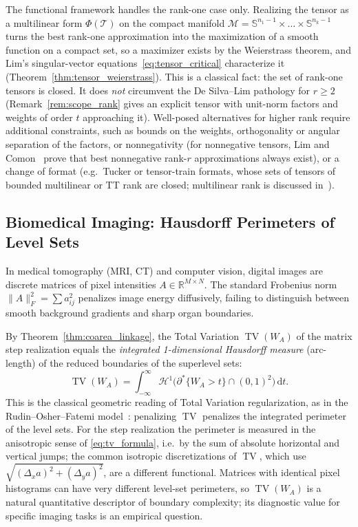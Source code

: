 \documentclass[11pt,a4paper,reqno]{amsart}
\theoremstyle{definition}
\numberwithin{equation}{section}
\newcommand{\R}{\mathbb{R}}
\newcommand{\Sph}{\mathbb{S}}
\newcommand{\TV}{\operatorname{TV}}
\newcommand{\dif}{\,\mathrm{d}}
\begin{document}
The functional framework handles the rank-one case only. Realizing the tensor as a multilinear form $\Phi(\mathcal{T})$ on the compact manifold $\mathcal{M} = \Sph^{n_1-1} \times \dots \times \Sph^{n_k-1}$ turns the best rank-one approximation into the maximization of a smooth function on a compact set, so a maximizer exists by the Weierstrass theorem, and Lim's singular-vector equations~\eqref{eq:tensor_critical} characterize it (Theorem~\ref{thm:tensor_weierstrass}). This is a classical fact: the set of rank-one tensors is closed. It does \emph{not} circumvent the De Silva--Lim pathology for $r \ge 2$ (Remark~\ref{rem:scope_rank} gives an explicit tensor with unit-norm factors and weights of order $t$ approaching it). Well-posed alternatives for higher rank require additional constraints, such as bounds on the weights, orthogonality or angular separation of the factors, or nonnegativity (for nonnegative tensors, Lim and Comon~\cite{lim2009nonnegative} prove that best nonnegative rank-$r$ approximations always exist), or a change of format (e.g.\ Tucker or tensor-train formats, whose sets of tensors of bounded multilinear or TT rank are closed; multilinear rank is discussed in~\cite[\S4]{lim2021tensors}).

\subsection{Biomedical Imaging: Hausdorff Perimeters of Level Sets}
\label{subsec:imp_imaging}
In medical tomography (MRI, CT) and computer vision, digital images are discrete matrices of pixel intensities $A \in \R^{M \times N}$. The standard Frobenius norm $\|A\|_F^2 = \sum a_{ij}^2$ penalizes image energy diffusively, failing to distinguish between smooth background gradients and sharp organ boundaries.

By Theorem~\ref{thm:coarea_linkage}, the Total Variation $\TV(W_A)$ of the matrix step realization equals the \emph{integrated 1-dimensional Hausdorff measure} (arc-length) of the reduced boundaries of the superlevel sets:
\begin{equation}
    \TV(W_A) = \int_{-\infty}^\infty \mathcal{H}^1\bigl(\partial^* \{W_A > t\} \cap (0,1)^2\bigr) \dif t.
\end{equation}
This is the classical geometric reading of Total Variation regularization, as in the Rudin--Osher--Fatemi model~\cite{rudin1992nonlinear}: penalizing $\TV$ penalizes the integrated perimeter of the level sets. For the step realization the perimeter is measured in the anisotropic sense of \eqref{eq:tv_formula}, i.e.\ by the sum of absolute horizontal and vertical jumps; the common isotropic discretizations of $\TV$, which use $\sqrt{(\Delta_x a)^2 + (\Delta_y a)^2}$, are a different functional. Matrices with identical pixel histograms can have very different level-set perimeters, so $\TV(W_A)$ is a natural quantitative descriptor of boundary complexity; its diagnostic value for specific imaging tasks is an empirical question.
\end{document}
